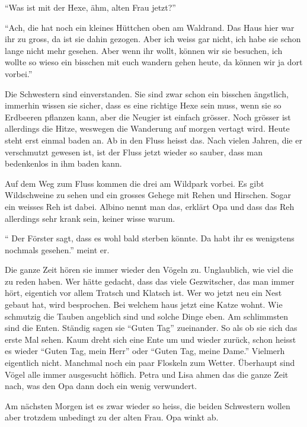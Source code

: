 \enquote{Was ist mit der Hexe, ähm, alten Frau jetzt?}

\enquote{Ach, die hat noch ein kleines Hüttchen oben am Waldrand. Das Haus hier war ihr zu gross, da ist sie dahin gezogen. Aber ich weiss gar nicht, ich habe sie schon lange nicht mehr gesehen. Aber wenn ihr wollt, können wir sie besuchen, ich wollte so wieso ein bisschen mit euch wandern gehen heute, da können wir ja dort vorbei.}

Die Schwestern sind einverstanden. Sie sind zwar schon ein bisschen ängstlich, immerhin wissen sie sicher, dass es eine richtige Hexe sein muss, wenn sie so Erdbeeren pflanzen kann, aber die Neugier ist einfach grösser. Noch grösser ist allerdings die Hitze, weswegen die Wanderung auf morgen vertagt wird. Heute steht erst einmal baden an. Ab in den Fluss heisst das. Nach vielen Jahren, die er verschmutzt gewesen ist, ist der Fluss jetzt wieder so sauber, dass man bedenkenlos in ihm baden kann.

Auf dem Weg zum Fluss kommen die drei am Wildpark vorbei. Es gibt Wildschweine zu sehen und ein grosses Gehege mit Rehen und Hirschen. Sogar ein weisses Reh ist dabei. Albino nennt man das, erklärt Opa und dass das Reh allerdings sehr krank sein, keiner wisse warum.

\enquote{ Der Förster sagt, dass es wohl bald sterben könnte. Da habt ihr es wenigstens nochmals gesehen.} meint er.

Die ganze Zeit hören sie immer wieder den Vögeln zu. Unglaublich, wie viel die zu reden haben. Wer hätte gedacht, dass das viele Gezwitscher, das man immer hört, eigentich vor allem Tratsch und Klatsch ist. Wer wo jetzt neu ein Nest gebaut hat, wird besprochen. Bei welchem haus jetzt eine Katze wohnt. Wie schmutzig die Tauben angeblich sind und solche Dinge eben. Am schlimmsten sind die Enten. Ständig sagen sie \enquote{Guten Tag} zueinander. So als ob sie sich das erste Mal sehen. Kaum dreht sich eine Ente um und wieder zurück, schon heisst es wieder \enquote{Guten Tag, mein Herr} oder \enquote{Guten Tag, meine Dame.} Vielmerh eigentlich nicht. Manchmal noch ein paar Floskeln zum Wetter. Überhaupt sind Vögel alle immer ausgesucht höflich. Petra und Lisa ahmen das die ganze Zeit nach, was den Opa dann doch ein wenig verwundert.

\begin{center}
\aldineleft
\end{center}

Am nächsten Morgen ist es zwar wieder so heiss, die beiden Schwestern wollen aber trotzdem unbedingt zu der alten Frau. Opa winkt ab.

